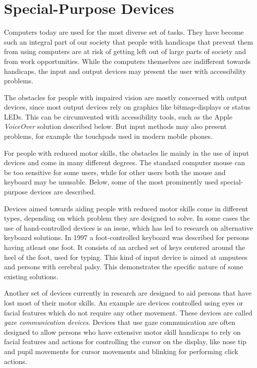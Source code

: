 
\section{Special-Purpose Devices}

Computers today are used for the most diverse set of tasks. They have become such an integral part of our society that people with handicaps that prevent them from using computers are at risk of getting left out of large parts of society and from work opportunities. While the computers themselves are indifferent towards handicaps, the input and output devices may present the user with accessibility problems.

The obstacles for people with impaired vision are mostly concerned with output devices, since most output devices rely on graphics like bitmap-displays or status LEDs. This can be circumvented with accessibility tools, such as the Apple \emph{VoiceOver} solution described below. But input methods may also present problems, for example the touchpads used in modern mobile phones.

For people with reduced motor skills, the obstacles lie mainly in the use of input devices and come in many different degrees. The standard computer mouse can be too sensitive for some users, while for other users both the mouse and keyboard may be unusable. Below, some of the most prominently used special-purpose devices are described.


Devices aimed towards aiding people with reduced motor skills come in different types, depending on which problem they are designed to solve. In some cases the use of hand-controlled devices is an issue, which has led to research on alternative keyboard solutions. In 1997 \cite{583209} a foot-controlled keyboard was described for persons having atleast one foot. It consists of an arched set of keys centered around the heel of the foot, used for typing. This kind of input device is aimed at amputees and persons with cerebral palsy. This demonstrates the specific nature of some existing solutions. 

Another set of devices currently in research are designed to aid persons that have lost most of their motor skills. An example are devices controlled using eyes or facial features which do not require any other movement. These devices are called \emph{gaze communication devices}. Devices that use gaze communication are often designed to allow persons who have extensive motor skill handicaps to rely on facial features and actions for controlling the cursor on the display, like nose tip and pupil movements for cursor movements and blinking for performing click actions\cite{ieee6398171}\cite{conf/itng/AraiM11a}.

